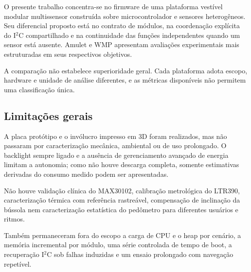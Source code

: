\documentclass[a4paper,12pt]{article}
\begin{document}
O presente trabalho concentra-se no firmware de uma plataforma vest\'ivel modular multissensor constru\'ida sobre microcontrolador e sensores heterog\^eneos. Seu diferencial proposto est\'a no contrato de m\'odulos, na coordena\c{c}\~ao expl\'icita do I$^2$C compartilhado e na continuidade das fun\c{c}\~oes independentes quando um sensor est\'a ausente. Amulet e WMP apresentam avalia\c{c}\~oes experimentais mais estruturadas em seus respectivos objetivos.


A compara\c{c}\~ao n\~ao estabelece superioridade geral. Cada plataforma adota escopo, hardware e unidade de an\'alise diferentes, e as m\'etricas dispon\'iveis n\~ao permitem uma classifica\c{c}\~ao \'unica.


\subsection{Limita\c{c}\~oes gerais}


A placa prot\'otipo e o inv\'olucro impresso em 3D foram realizados, mas n\~ao passaram por caracteriza\c{c}\~ao mec\^anica, ambiental ou de uso prolongado. O backlight sempre ligado e a aus\^encia de gerenciamento avan\c{c}ado de energia limitam a autonomia; como n\~ao houve descarga completa, somente estimativas derivadas do consumo medido podem ser apresentadas.


N\~ao houve valida\c{c}\~ao cl\'inica do MAX30102, calibra\c{c}\~ao metrol\'ogica do LTR390, caracteriza\c{c}\~ao t\'ermica com refer\^encia rastre\'avel, compensa\c{c}\~ao de inclina\c{c}\~ao da b\'ussola nem caracteriza\c{c}\~ao estat\'istica do ped\^ometro para diferentes usu\'arios e ritmos.


Tamb\'em permaneceram fora do escopo a carga de CPU e o heap por cen\'ario, a mem\'oria incremental por m\'odulo, uma s\'erie controlada de tempo de boot, a recupera\c{c}\~ao I$^2$C sob falhas induzidas e um ensaio prolongado com navega\c{c}\~ao repet\'ivel.
\end{document}
